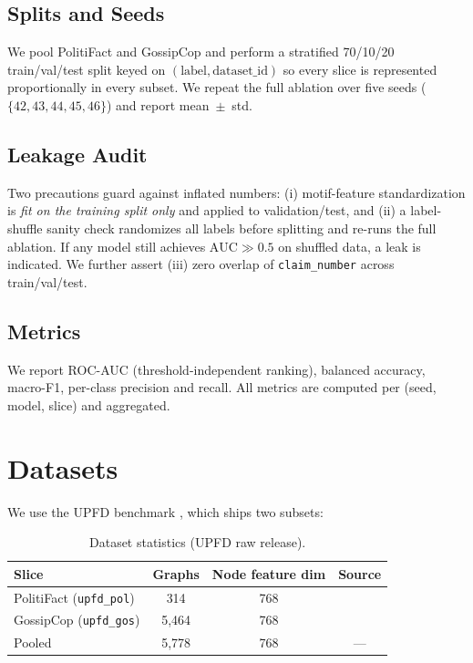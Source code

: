 \documentclass[conference]{IEEEtran}
\begin{document}
\subsection{Splits and Seeds}
We pool PolitiFact and GossipCop and perform a stratified 70/10/20 train/val/test split keyed on $(\text{label}, \text{dataset\_id})$ so every slice is represented proportionally in every subset. We repeat the full ablation over five seeds ($\{42, 43, 44, 45, 46\}$) and report mean~$\pm$~std.

\subsection{Leakage Audit}
\label{sec:leakage}
Two precautions guard against inflated numbers: (i) motif-feature standardization is \emph{fit on the training split only} and applied to validation/test, and (ii) a label-shuffle sanity check randomizes all labels before splitting and re-runs the full ablation. If any model still achieves $\mathrm{AUC} \gg 0.5$ on shuffled data, a leak is indicated. We further assert (iii) zero overlap of \texttt{claim\_number} across train/val/test.

\subsection{Metrics}
We report ROC-AUC (threshold-independent ranking), balanced accuracy, macro-F1, per-class precision and recall. All metrics are computed per (seed, model, slice) and aggregated.

\section{Datasets}
We use the UPFD benchmark \cite{dou2021upfd}, which ships two subsets:

\begin{table}[t]
\centering
\caption{Dataset statistics (UPFD raw release).}
\label{tab:datasets}
\begin{tabular}{lccc}
\toprule
Slice & Graphs & Node feature dim & Source \\
\midrule
PolitiFact (\texttt{upfd\_pol}) & 314  & 768 & \cite{dou2021upfd} \\
GossipCop  (\texttt{upfd\_gos}) & 5{,}464 & 768 & \cite{dou2021upfd} \\
\midrule
Pooled     & 5{,}778 & 768 & --- \\
\bottomrule
\end{tabular}
\end{table}
\end{document}
